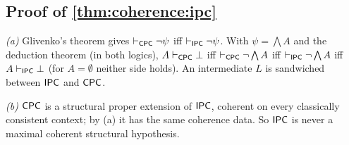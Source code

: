 \subsection{Proof of \texorpdfstring{\cref{thm:coherence:ipc}}{the intuitionistic theorem}}\label{app:coherence:ipc}

\emph{(a)} Glivenko's theorem \citep{glivenko1929quelques} gives $\vdash_{\mathsf{CPC}}\neg\psi$ iff $\vdash_{\mathsf{IPC}}\neg\psi$. With $\psi=\bigwedge A$ and the deduction theorem (in both logics), $A\vdash_{\mathsf{CPC}}\bot$ iff $\vdash_{\mathsf{CPC}}\neg\bigwedge A$ iff $\vdash_{\mathsf{IPC}}\neg\bigwedge A$ iff $A\vdash_{\mathsf{IPC}}\bot$ (for $A=\emptyset$ neither side holds). An intermediate $L$ is sandwiched between $\mathsf{IPC}$ and $\mathsf{CPC}$.

\emph{(b)} $\mathsf{CPC}$ is a structural proper extension of $\mathsf{IPC}$, coherent on every classically consistent context; by (a) it has the same coherence data. So $\mathsf{IPC}$ is never a maximal coherent structural hypothesis.

